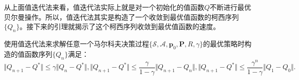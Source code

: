 从上面值迭代法来看，值迭代法实际上就是对一个初始化的值函数$Q$不断进行最优贝尔曼操作。所以，值迭代法其实是构造了一个收敛到最优值函数的柯西序列$\{Q_n\}$。接下来的引理就揭示了这个柯西序列收敛到最优值函数的速度。

\begin{theorem}[值迭代法的收敛率]
    使用值迭代法来求解任意一个马尔科夫决策过程$\{\mathcal{S}, \mathcal{A}, \mathbf{p}_0, \mathbf{P}, R, \gamma\}$的最优策略时构造的值函数序列$\{Q_n\}$满足：
    \begin{subequations}
        \begin{equation}
            \Vert Q_{n+1} - Q^* \Vert \le \gamma
            \Vert Q_{n} - Q^* \Vert,
        \end{equation}
        \begin{equation}
            \Vert Q_{n+1} - Q^* \Vert \le \frac{\gamma}{1 - \gamma} 
            \Vert Q_{n+1} - Q_n \Vert,
        \end{equation}
        \begin{equation}
            \Vert Q_{n+1} - Q^* \Vert \le \frac{\gamma^n}{1-\gamma}
            \Vert Q_{1} - Q_0 \Vert.
        \end{equation}
    \end{subequations}
\end{theorem}
